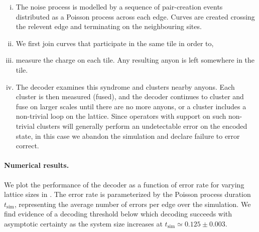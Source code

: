 \documentclass[aps, prl, letterpaper, twocolumn, superscriptaddress, notitlepage, 10pt]{revtex4-1}
\begin{document}
\begin{enumerate}[i)]
	\item The noise process is modelled by a sequence of pair-creation events distributed as a Poisson process across each edge. Curves are created crossing the relevent edge and terminating on the neighbouring sites.
	\item We first join curves that participate in the same tile in order to, 
	\item measure the charge on each tile. Any resulting anyon is left somewhere in the tile.
	\item The decoder examines this syndrome and clusters nearby anyons. Each cluster is then measured (fused), and the decoder continues to cluster and fuse on larger scales until there are no more anyons, or a cluster includes a non-trivial loop on the lattice. Since operators with support on such non-trivial clusters will generally perform an undetectable error on the encoded state, in this case we abandon the simulation and declare failure to error correct.
\end{enumerate}

\paragraph{Numerical results.}

	We plot the performance of the decoder as a function of error rate for varying lattice sizes in . The error rate is parameterized by the Poisson process duration $t_{\mathrm{sim}}$, representing the average number of errors per edge over the simulation. We find evidence of a decoding threshold below which decoding succeeds with asymptotic certainty as the system size increases at $t_{\mathrm{sim}}\simeq 0.125 \pm 0.003$.
\end{document}

